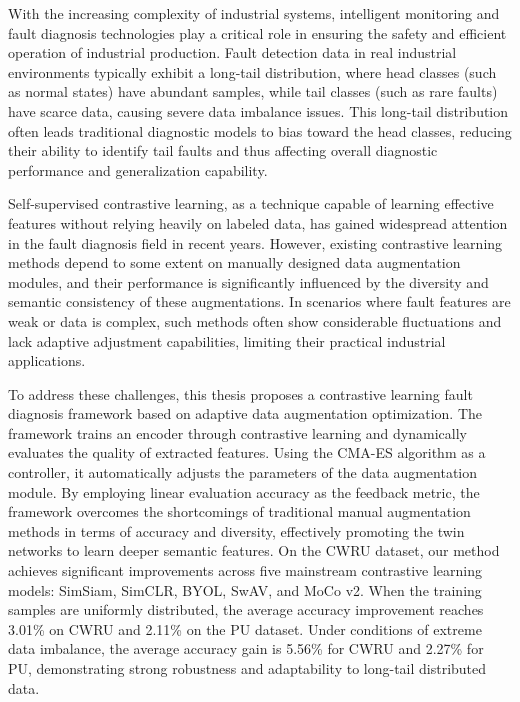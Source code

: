 \documentclass[master]{thesis-uestc}
\begin{document}
\begin{englishabstract}
    With the increasing complexity of industrial systems, intelligent monitoring and fault diagnosis technologies play a critical role in ensuring the safety and efficient operation of industrial production. Fault detection data in real industrial environments typically exhibit a long-tail distribution, where head classes (such as normal states) have abundant samples, while tail classes (such as rare faults) have scarce data, causing severe data imbalance issues. This long-tail distribution often leads traditional diagnostic models to bias toward the head classes, reducing their ability to identify tail faults and thus affecting overall diagnostic performance and generalization capability.

    Self-supervised contrastive learning, as a technique capable of learning effective features without relying heavily on labeled data, has gained widespread attention in the fault diagnosis field in recent years. However, existing contrastive learning methods depend to some extent on manually designed data augmentation modules, and their performance is significantly influenced by the diversity and semantic consistency of these augmentations. In scenarios where fault features are weak or data is complex, such methods often show considerable fluctuations and lack adaptive adjustment capabilities, limiting their practical industrial applications.

    To address these challenges, this thesis proposes a contrastive learning fault diagnosis framework based on adaptive data augmentation optimization. The framework trains an encoder through contrastive learning and dynamically evaluates the quality of extracted features. Using the CMA-ES algorithm as a controller, it automatically adjusts the parameters of the data augmentation module. By employing linear evaluation accuracy as the feedback metric, the framework overcomes the shortcomings of traditional manual augmentation methods in terms of accuracy and diversity, effectively promoting the twin networks to learn deeper semantic features. On the CWRU dataset, our method achieves significant improvements across five mainstream contrastive learning models: SimSiam, SimCLR, BYOL, SwAV, and MoCo v2. When the training samples are uniformly distributed, the average accuracy improvement reaches 3.01\% on CWRU and 2.11\% on the PU dataset. Under conditions of extreme data imbalance, the average accuracy gain is 5.56\% for CWRU and 2.27\% for PU, demonstrating strong robustness and adaptability to long-tail distributed data.


\end{englishabstract}
\end{document}
